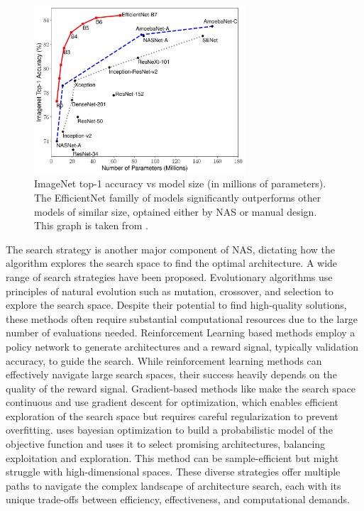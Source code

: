 \begin{figure}[htbp]
    \centering
    \includegraphics[width=0.70\textwidth]{chapter_sota/assets/efficientnet_perfs_overview.pdf}   
    \caption{ImageNet top-1 accuracy vs model size (in millions of parameters).
    The EfficientNet familly of models significantly outperforms other models of
    similar size, optained either by \ac{NAS} or manual design. This graph is
    taken from \cite{DBLP:conf/icml/TanL19}.
    }
    \label{fig:sota:efficientnet_perfs}
\end{figure}


The search strategy is another major component of \ac{NAS}, dictating how the
algorithm explores the search space to find the optimal architecture. A wide
range of search strategies have been proposed. Evolutionary algorithms
\cite{DBLP:conf/icml/RealMSSSTLK17} use principles of natural evolution such as
mutation, crossover, and selection to explore the search space. Despite their
potential to find high-quality solutions, these methods often require
substantial computational resources due to the large number of evaluations
needed. Reinforcement Learning based methods \cite{DBLP:conf/iclr/ZophL17}
employ a policy network to generate architectures and a reward signal, typically
validation accuracy, to guide the search. While reinforcement learning methods
can effectively navigate large search spaces, their success heavily depends on
the quality of the reward signal. Gradient-based methods like
\cite{DBLP:conf/iclr/LiuSY19,DBLP:conf/iclr/XuX0CQ0X20} make the search space
continuous and use gradient descent for optimization, which enables efficient
exploration of the search space but requires careful regularization to prevent
overfitting. \cite{DBLP:conf/nips/BergstraBBK11} uses bayesian optimization to
build a probabilistic model of the objective function and uses it to select
promising architectures, balancing exploitation and exploration. This method can
be sample-efficient but might struggle with high-dimensional spaces. These
diverse strategies offer multiple paths to navigate the complex landscape of
architecture search, each with its unique trade-offs between efficiency,
effectiveness, and computational demands.

